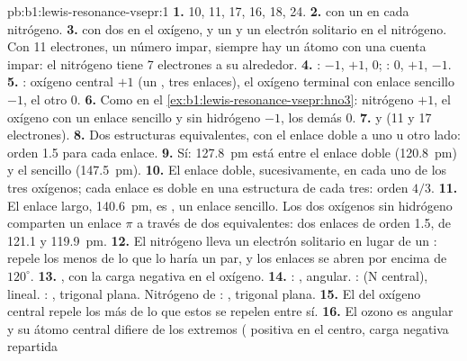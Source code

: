 \begin{solution}{pb:b1:lewis-resonance-vsepr:1}
\textbf{1.}  10,  11,  17,  16,  18,
 24.
\textbf{2.}  con un  en cada nitrógeno.
\textbf{3.}  con dos  en el oxígeno, y un  y un electrón solitario en el nitrógeno. Con 11 electrones,
un número impar, siempre hay un átomo con una cuenta impar: el nitrógeno
tiene 7 electrones a su alrededor.
\textbf{4.} : $-1$, $+1$, $0$; : $0$, $+1$, $-1$.
\textbf{5.} : oxígeno central $+1$ (un , tres
enlaces), el oxígeno terminal con enlace sencillo $-1$, el otro 0.
\textbf{6.} Como en el \cref{ex:b1:lewis-resonance-vsepr:hno3}: nitrógeno
$+1$, el oxígeno con un enlace sencillo y sin hidrógeno $-1$, los demás 0.
\textbf{7.}  y  (11 y 17 electrones).
\textbf{8.} Dos estructuras equivalentes, con el enlace doble a uno u
otro lado: orden 1.5 para cada enlace.
\textbf{9.} Sí: \qty{127.8}{pm} está entre el enlace doble
(\qty{120.8}{pm}) y el sencillo (\qty{147.5}{pm}).
\textbf{10.} El enlace doble, sucesivamente, en cada uno de los tres
oxígenos; cada enlace  es doble en una estructura de cada tres:
orden $4/3$.
\textbf{11.} El enlace largo, \qty{140.6}{pm}, es , un enlace
sencillo. Los dos oxígenos sin hidrógeno comparten un enlace $\pi$ a
través de dos  equivalentes: dos enlaces de orden 1.5,
de 121.1 y \qty{119.9}{pm}.
\textbf{12.} El nitrógeno lleva un electrón solitario en lugar de un : repele los  menos de lo que lo haría un
par, y los enlaces se abren por encima de $120^\circ$.
\textbf{13.} , con la carga negativa en el oxígeno.
\textbf{14.} : , angular. :  (N central),
lineal. : , trigonal plana. Nitrógeno de :
, trigonal plana.
\textbf{15.} El  del oxígeno central repele los  más de lo que estos se repelen entre sí.
\textbf{16.} El ozono es angular y su átomo central difiere de los
extremos ( positiva en el centro, carga negativa repartida

\end{solution}
